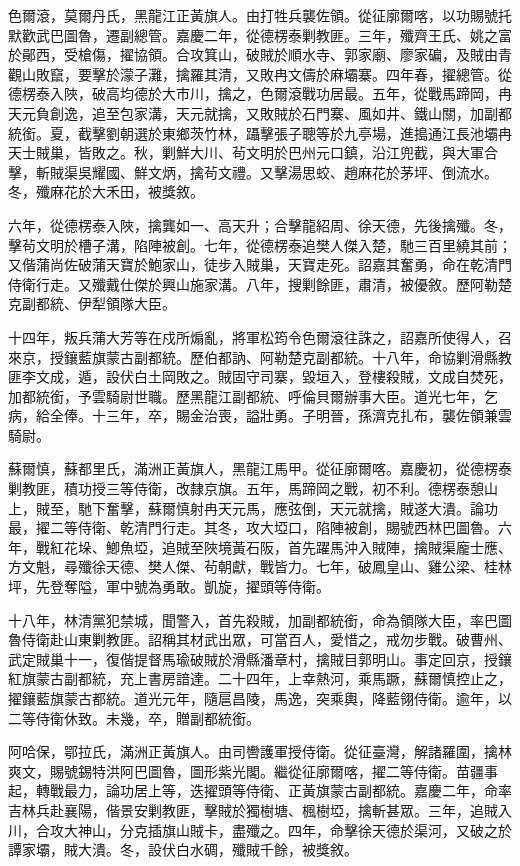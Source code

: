 \begin{pinyinscope}
色爾滾，莫爾丹氏，黑龍江正黃旗人。由打牲兵襲佐領。從征廓爾喀，以功賜號托默歡武巴圖魯，遷副總管。嘉慶二年，從德楞泰剿教匪。三年，殲齊王氏、姚之富於鄖西，受槍傷，擢協領。合攻箕山，破賊於順水寺、郭家廟、廖家碥，及賊由青觀山敗竄，要擊於濛子灘，擒羅其清，又敗冉文儔於麻壩寨。四年春，擢總管。從德楞泰入陜，破高均德於大市川，擒之，色爾滾戰功居最。五年，從戰馬蹄岡，冉天元負創逸，追至包家溝，天元就擒，又敗賊於石門寨、風如井、鐵山關，加副都統銜。夏，截擊劉朝選於東鄉茨竹林，躡擊張子聰等於九亭場，進搗通江長池壩冉天士賊巢，皆敗之。秋，剿鮮大川、茍文明於巴州元口鎮，沿江兜截，與大軍合擊，斬賊渠吳耀國、鮮文炳，擒茍文禮。又擊湯思蛟、趙麻花於茅坪、倒流水。冬，殲麻花於大禾田，被獎敘。

六年，從德楞泰入陜，擒龔如一、高天升；合擊龍紹周、徐天德，先後擒殲。冬，擊茍文明於槽子溝，陷陣被創。七年，從德楞泰追樊人傑入楚，馳三百里繞其前；又偕蒲尚佐破蒲天寶於鮑家山，徒步入賊巢，天寶走死。詔嘉其奮勇，命在乾清門侍衛行走。又殲戴仕傑於興山施家溝。八年，搜剿餘匪，肅清，被優敘。歷阿勒楚克副都統、伊犁領隊大臣。

十四年，叛兵蒲大芳等在戍所煽亂，將軍松筠令色爾滾往誅之，詔嘉所使得人，召來京，授鑲藍旗蒙古副都統。歷伯都訥、阿勒楚克副都統。十八年，命協剿滑縣教匪李文成，遁，設伏白土岡敗之。賊固守司寨，毀垣入，登樓殺賊，文成自焚死，加都統銜，予雲騎尉世職。歷黑龍江副都統、呼倫貝爾辦事大臣。道光七年，乞病，給全俸。十三年，卒，賜金治喪，謚壯勇。子明晉，孫濟克扎布，襲佐領兼雲騎尉。

蘇爾慎，蘇都里氏，滿洲正黃旗人，黑龍江馬甲。從征廓爾喀。嘉慶初，從德楞泰剿教匪，積功授三等侍衛，改隸京旗。五年，馬蹄岡之戰，初不利。德楞泰憩山上，賊至，馳下奮擊，蘇爾慎射冉天元馬，應弦倒，天元就擒，賊遂大潰。論功最，擢二等侍衛、乾清門行走。其冬，攻大埡口，陷陣被創，賜號西林巴圖魯。六年，戰紅花垛、鯽魚埡，追賊至陜境黃石阪，首先躍馬沖入賊陣，擒賊渠龐士應、方文魁，尋殲徐天德、樊人傑、茍朝獻，戰皆力。七年，破鳳皇山、雞公梁、桂林坪，先登奪隘，軍中號為勇敢。凱旋，擢頭等侍衛。

十八年，林清黨犯禁城，聞警入，首先殺賊，加副都統銜，命為領隊大臣，率巴圖魯侍衛赴山東剿教匪。詔稱其材武出眾，可當百人，愛惜之，戒勿步戰。破曹州、武定賊巢十一，復偕提督馬瑜破賊於滑縣潘章村，擒賊目郭明山。事定回京，授鑲紅旗蒙古副都統，充上書房諳達。二十四年，上幸熱河，乘馬蹶，蘇爾慎控止之，擢鑲藍旗蒙古都統。道光元年，隨扈昌陵，馬逸，突乘輿，降藍翎侍衛。逾年，以二等侍衛休致。未幾，卒，贈副都統銜。

阿哈保，鄂拉氏，滿洲正黃旗人。由司轡護軍授侍衛。從征臺灣，解諸羅圍，擒林爽文，賜號錫特洪阿巴圖魯，圖形紫光閣。繼從征廓爾喀，擢二等侍衛。苗疆事起，轉戰最力，論功居上等，迭擢頭等侍衛、正黃旗蒙古副都統。嘉慶二年，命率吉林兵赴襄陽，偕景安剿教匪，擊賊於獨樹塘、楓樹埡，擒斬甚眾。三年，追賊入川，合攻大神山，分克插旗山賊卡，盡殲之。四年，命擊徐天德於渠河，又破之於譚家壩，賊大潰。冬，設伏白水碉，殲賊千餘，被獎敘。


\end{pinyinscope}
